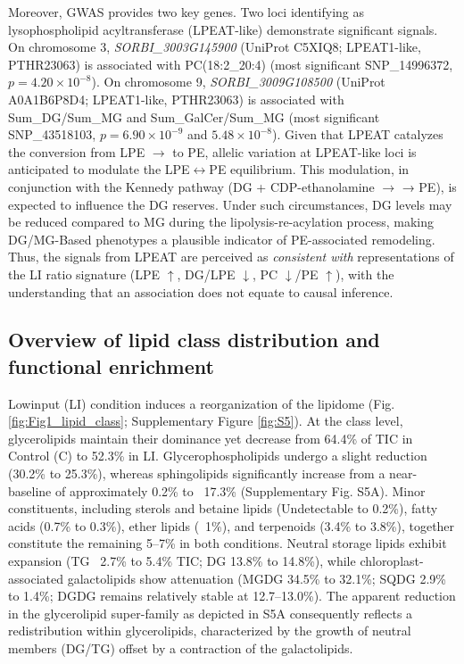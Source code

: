 \documentclass[10pt,letterpaper]{article}
\begin{document}
Moreover, GWAS provides two key genes. Two loci identifying as lysophospholipid acyltransferase (LPEAT-like) demonstrate significant signals. On chromosome 3, \textit{SORBI\_3003G145900} (UniProt C5XIQ8; LPEAT1-like, PTHR23063) is associated with PC(18:2\_20:4) (most significant SNP\_14996372, $p = 4.20 \times 10^{-8}$). On chromosome 9, \textit{SORBI\_3009G108500} (UniProt A0A1B6P8D4; LPEAT1-like, PTHR23063) is associated with Sum\_DG/Sum\_MG and Sum\_GalCer/Sum\_MG (most significant SNP\_43518103, $p = 6.90 \times 10^{-9}$ and $5.48 \times 10^{-8}$). Given that LPEAT catalyzes the conversion from LPE $\rightarrow$ to PE, allelic variation at LPEAT-like loci is anticipated to modulate the LPE$\leftrightarrow$PE equilibrium. This modulation, in conjunction with the Kennedy pathway (DG + CDP-ethanolamine $\rightarrow$ → PE), is expected to influence the DG reserves. Under such circumstances, DG levels may be reduced compared to MG during the lipolysis-re-acylation process, making DG/MG-Based phenotypes a plausible indicator of PE-associated remodeling. Thus, the signals from LPEAT are perceived as \emph{consistent with} representations of the LI ratio signature (LPE $\uparrow$, DG/LPE $\downarrow$, PC $\downarrow$/PE $\uparrow$), with the understanding that an association does not equate to causal inference.




\subsection*{Overview of lipid class distribution and functional enrichment}
Lowinput (LI) condition induces a reorganization of the lipidome (Fig.\ref{fig:Fig1_lipid_class}; Supplementary Figure \ref{fig:S5}). At the class level, glycerolipids maintain their dominance yet decrease from 64.4\% of TIC in Control (C) to 52.3\% in LI. Glycerophospholipids undergo a slight reduction (30.2\% to 25.3\%), whereas sphingolipids significantly increase from a near-baseline of approximately 0.2\% to ~17.3\% (Supplementary Fig. S5A). Minor constituents, including sterols and betaine lipids (Undetectable to 0.2\%), fatty acids (0.7\% to 0.3\%), ether lipids (~1\%), and terpenoids (3.4\% to 3.8\%), together constitute the remaining 5–7\% in both conditions. Neutral storage lipids exhibit expansion (TG ~2.7\% to 5.4\% TIC; DG 13.8\% to 14.8\%), while chloroplast-associated galactolipids show attenuation (MGDG 34.5\% to 32.1\%; SQDG 2.9\% to 1.4\%; DGDG remains relatively stable at 12.7–13.0\%). The apparent reduction in the glycerolipid super-family as depicted in S5A consequently reflects a redistribution within glycerolipids, characterized by the growth of neutral members (DG/TG) offset by a contraction of the galactolipids.
\end{document}
